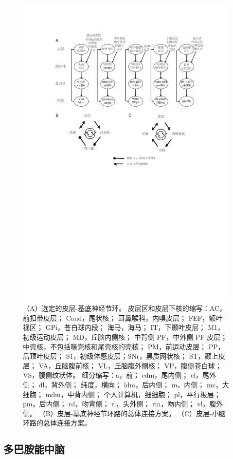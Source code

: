 \begin{figure} 
	\centering
	\includegraphics[width=0.72\linewidth]{chap8/fig_8_1}
	\caption{（A）选定的皮层-基底神经节环\cite{alexander1986parallel}。
	皮层区和皮层下核的缩写：AC，前扣带皮层； Caud，尾状核； 耳鼻喉科，内嗅皮层； FEF，额叶视区； GPi，苍白球内段； 海马，海马； IT，下颞叶皮层； M1，初级运动皮层； MD，丘脑内侧核； 中背侧 PF，中外侧 PF 皮层； 中壳核，不包括喙壳核和尾壳核的壳核； PM，前运动皮层； PP，后顶叶皮层； S1，初级体感皮层；SNr，黑质网状核； ST，颞上皮层； VA，丘脑腹前核； VL，丘脑腹外侧核； VP，腹侧苍白球； VS，腹侧纹状体。 细分缩写：a，前； cdm，尾内侧； cl，尾外侧； dl，背外侧； 纬度，横向； ldm，后内侧； m，内侧； mc，大细胞； mdm，中背内侧； 个人计算机，细细胞； pl，平行板层； pm，后内侧； rd，吻背侧； rl，头外侧； rm，吻内侧； vl，腹外侧。
	（B）皮层-基底神经节环路的总体连接方案。 
	（C）皮层-小脑环路的总体连接方案\cite{shadmehr2004computational}。\label{fig:8_1}}
\end{figure}





\subsection{多巴胺能中脑}
\par

